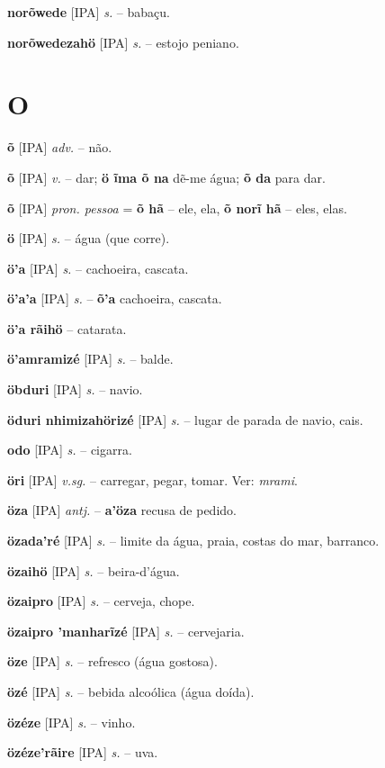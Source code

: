 \textbf{norõwede} [IPA] \textit{s.} -- babaçu.

\textbf{norõwedezahö} [IPA] \textit{s.} -- estojo peniano.


\section*{O}


\textbf{õ} [IPA] \textit{adv.} -- não.

\textbf{õ} [IPA] \textit{v.} -- dar; \textbf{ö ĩma õ na} dẽ-me água; \textbf{õ da} para dar.

\textbf{õ} [IPA] \textit{pron. pessoa} = \textbf{õ hã} -- ele, ela, \textbf{õ norĩ hã} -- eles, elas.

\textbf{ö} [IPA] \textit{s.} -- água (que corre).

\textbf{ö'a} [IPA] \textit{s.} -- cachoeira, cascata.

\textbf{ö'a'a} [IPA] \textit{s.} -- \textbf{õ'a} cachoeira, cascata.

\textbf{ö'a rãihö} -- catarata.

\textbf{ö'amramizé} [IPA] \textit{s.} -- balde.

\textbf{öbduri} [IPA] \textit{s.} -- navio.

\textbf{öduri nhimizahörizé} [IPA] \textit{s.} -- lugar de parada de navio, cais.

\textbf{odo} [IPA] \textit{s.} -- cigarra.

\textbf{öri} [IPA] \textit{v.sg.} -- carregar, pegar, tomar. Ver: \textit{mrami}.

\textbf{öza} [IPA] \textit{antj.} -- \textbf{a'öza} recusa de pedido.

\textbf{özada'ré} [IPA] \textit{s.} -- limite da água, praia, costas do mar, barranco.

\textbf{özaihö} [IPA] \textit{s.} -- beira-d'água.

\textbf{özaipro} [IPA] \textit{s.} -- cerveja, chope.

\textbf{özaipro 'manharĩzé} [IPA] \textit{s.} -- cervejaria.

\textbf{öze} [IPA] \textit{s.} -- refresco (água gostosa).

\textbf{özé} [IPA] \textit{s.} -- bebida alcoólica (água doída).

\textbf{özéze} [IPA] \textit{s.} -- vinho.

\textbf{özéze'rãire} [IPA] \textit{s.} -- uva.

